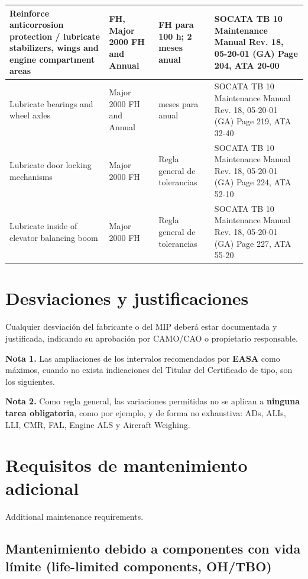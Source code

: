 \documentclass[12pt]{article}
\newcommand{\FH}{FH}
\begin{document}
\begin{longtable}{|>{\raggedright\arraybackslash}p{}|>{\raggedright\arraybackslash}p{}|>{\raggedright\arraybackslash}p{}|>{\raggedright\arraybackslash}p{}|}
\hline
Reinforce anticorrosion protection / lubricate stabilizers, wings and engine compartment areas & 100 \FH, Major 2000 \FH{} and Annual & 10 \FH{} para 100 h; 2 meses anual & SOCATA TB 10 Maintenance Manual Rev. 18, 05-20-01 (GA) Page 204, ATA 20-00 \\
\hline
Lubricate bearings and wheel axles & Major 2000 \FH{} and Annual & 2 meses para anual & SOCATA TB 10 Maintenance Manual Rev. 18, 05-20-01 (GA) Page 219, ATA 32-40 \\
\hline
Lubricate door locking mechanisms & Major 2000 \FH & Regla general de tolerancias & SOCATA TB 10 Maintenance Manual Rev. 18, 05-20-01 (GA) Page 224, ATA 52-10 \\
\hline
Lubricate inside of elevator balancing boom & Major 2000 \FH & Regla general de tolerancias & SOCATA TB 10 Maintenance Manual Rev. 18, 05-20-01 (GA) Page 227, ATA 55-20 \\
\hline
\end{longtable}
\endgroup

\section{Desviaciones y justificaciones}
\label{sec:desviaciones}

Cualquier desviación del fabricante o del MIP deberá estar documentada y justificada, indicando su aprobación por CAMO/CAO o propietario responsable.

\noindent\textbf{Nota 1.} Las ampliaciones de los intervalos recomendados por \textbf{EASA} como máximos, cuando no exista indicaciones del Titular del Certificado de tipo, son los siguientes.

\noindent\textbf{Nota 2.} Como regla general, las variaciones permitidas no se aplican a \textbf{ninguna tarea obligatoria}, como por ejemplo, y de forma no exhaustiva: ADs, ALIs, LLI, CMR, FAL, Engine ALS y Aircraft Weighing.

\section{Requisitos de mantenimiento adicional}
\label{sec:mantenimiento-adicional}

Additional maintenance requirements.

\subsection{Mantenimiento debido a componentes con vida límite (life-limited components, OH/TBO)}
\label{subsec:vida-limite}
\end{document}
